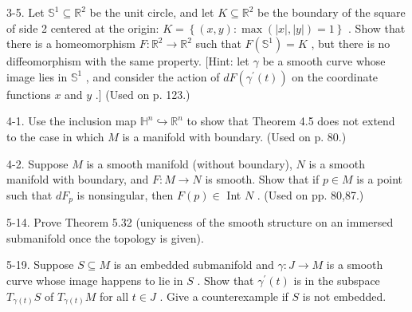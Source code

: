 \begin{exercise}
\label{prob:3-5}


3-5. Let ${\mathbb{S}}^{1} \subseteq  {\mathbb{R}}^{2}$ be the unit circle, and let $K \subseteq  {\mathbb{R}}^{2}$ be the boundary of the square of side 2 centered at the origin: $K = \left\{  {\left( {x, y}\right)  : \max \left( {\left| x\right| ,\left| y\right| }\right)  = 1}\right\}$ . Show that there is a homeomorphism $F : {\mathbb{R}}^{2} \rightarrow  {\mathbb{R}}^{2}$ such that $F\left( {\mathbb{S}}^{1}\right)  = K$ , but there is no diffeomorphism with the same property. [Hint: let $\gamma$ be a smooth curve whose image lies in ${\mathbb{S}}^{1}$ , and consider the action of ${dF}\left( {{\gamma }^{\prime }\left( t\right) }\right)$ on the coordinate functions $x$ and $y$ .] (Used on p. 123.)
\end{exercise}

\begin{exercise}
\label{prob:4-1}


4-1. Use the inclusion map ${\mathbb{H}}^{n} \hookrightarrow  {\mathbb{R}}^{n}$ to show that Theorem 4.5 does not extend to the case in which $M$ is a manifold with boundary. (Used on p. 80.)
\end{exercise}

\begin{exercise}
\label{prob:4-2}


4-2. Suppose $M$ is a smooth manifold (without boundary), $N$ is a smooth manifold with boundary, and $F : M \rightarrow  N$ is smooth. Show that if $p \in  M$ is a point such that $d{F}_{p}$ is nonsingular, then $F\left( p\right)  \in$ Int $N$ . (Used on pp. 80,87.)
\end{exercise}

\begin{exercise}
\label{prob:5-14}


5-14. Prove Theorem 5.32 (uniqueness of the smooth structure on an immersed submanifold once the topology is given).
\end{exercise}

\begin{exercise}
\label{prob:5-19}


5-19. Suppose $S \subseteq  M$ is an embedded submanifold and $\gamma  : J \rightarrow  M$ is a smooth curve whose image happens to lie in $S$ . Show that ${\gamma }^{\prime }\left( t\right)$ is in the subspace ${T}_{\gamma \left( t\right) }S$ of ${T}_{\gamma \left( t\right) }M$ for all $t \in  J$ . Give a counterexample if $S$ is not embedded.
\end{exercise}

